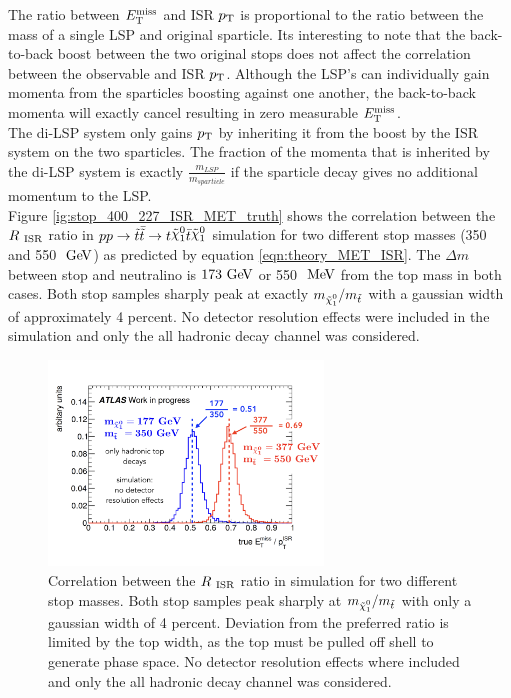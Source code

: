 \indent The ratio between $E_{\mathrm{T}}^{\mathrm{miss}}$ and ISR $p_{\mathrm{T}}$ is proportional to the ratio between the mass of a single LSP and original sparticle.  Its interesting to note that the back-to-back boost between the two original stops does not affect the correlation between the observable \MET and ISR $p_{\mathrm{T}}$.  Although the LSP's can individually gain momenta from the sparticles boosting against one another, the back-to-back momenta will exactly cancel resulting in zero measurable $E_{\mathrm{T}}^{\mathrm{miss}}$.  \\

\indent The di-LSP system only gains $p_{\mathrm{T}}$ by inheriting it from the boost by the ISR system on the two sparticles.  The fraction of the momenta that is inherited by the di-LSP system is exactly $\frac{m_{LSP}}{m_{sparticle}}$ if the sparticle decay gives no additional momentum to the LSP.  \\

\indent Figure \ref{ig:stop_400_227_ISR_MET_truth} shows the correlation between the $R_{~\mathrm{ISR}}$ ratio in $p p \rightarrow \antibar{\stop} \rightarrow t\ninoone\tbar\ninoone$ simulation for two different stop masses (350 and 550 $\gev$) as predicted by equation \ref{eqn:theory_MET_ISR}.  The $\Delta m$ between stop and neutralino is $173 \gev$ or 550 $\mev$ from the top mass in both cases.  Both stop samples sharply peak at exactly $m_{\ninoone}/m_{\stop}$ with a gaussian width of approximately 4 percent.  No detector resolution effects were included in the simulation and only the all hadronic decay channel was considered. \\

\begin{figure}[h!]
  \centering
	\includegraphics[width=0.65\textwidth]{./figures/strategy/RISR_truth.png}
\caption{Correlation between the $R_{~\mathrm{ISR}}$ ratio in simulation for two different stop masses.  Both stop samples peak sharply at $m_{\ninoone}/m_{\stop}$ with only a gaussian width of 4 percent.  Deviation from the preferred ratio is limited by the top width, as the top must be pulled off shell to generate phase space. No detector resolution effects where included and only the all hadronic decay channel was considered.}
\label{fig:stop_400_227_ISR_MET_truth}
\end{figure}

